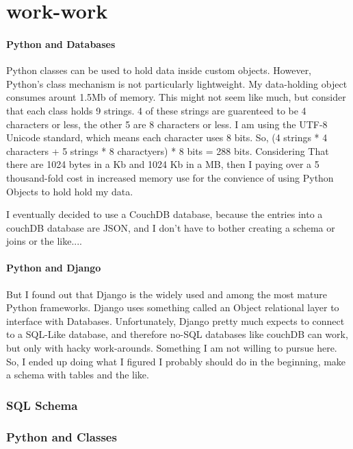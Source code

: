 \chapter{work-work}



\subsubsection{Python and Databases}
Python classes can be used to hold data inside custom objects.  However, Python's class mechanism is not particularly lightweight.  My data-holding object consumes arount 1.5Mb of memory.  This might not seem like much, but consider that each class holds 9 strings.  4 of these strings are guarenteed to be 4 characters or less, the other 5 are 8 characters or less.  I am using the UTF-8 Unicode standard, which means each character uses 8 bits.  So, (4 strings * 4 characters + 5 strings * 8 charactyers) * 8 bits = 288 bits.  Considering That there are 1024 bytes in a Kb and 1024 Kb in a MB, then I paying over a 5 thousand-fold cost in increased memory use for the convience of using Python Objects to hold hold my data.

I eventually decided to use a CouchDB database, because the entries into a couchDB database are JSON, and I don't have to bother creating a schema or joins or the like....

\subsubsection{Python and Django}

But I found out that Django is the widely used and among the most mature Python frameworks.  Django uses something called an Object relational layer to interface with Databases.  Unfortunately, Django pretty much expects to connect to a SQL-Like database, and therefore no-SQL databases like couchDB can work, but only with hacky work-arounds.  Something I am not willing to pursue here.   So, I ended up doing what I figured I probably should do in the beginning, make a schema with tables and the like.


\subsection{SQL Schema}



\subsection{Python and Classes}

